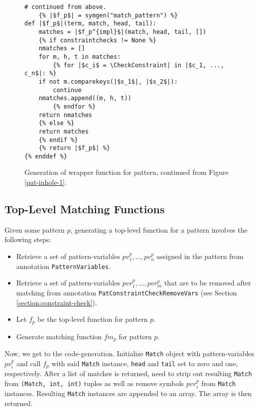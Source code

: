 \begin{figure}
\begin{verbatim}
# continued from above.
	{% |$f_p$| = symgen("match_pattern") %}
def |$f_p$|(term, match, head, tail):
	matches = |$f_p^{impl}$|(match, head, tail, [])
	{% if constraintchecks != None %}
	nmatches = []
	for m, h, t in matches:
		{% for |$c_i$ = \CheckConstraint| in |$c_1, ..., c_n$|: %}
	if not m.comparekeys(|$s_1$|, |$s_2$|):
		continue
	nmatches.append((m, h, t))
		{% endfor %}
	return nmatches
	{% else %}
	return matches
	{% endif %}
	{% return |$f_p$| %}
{% enddef %}
\end{verbatim} 
\caption{Generation of wrapper function for \PatternInHoleNoArg \space pattern, continued from Figure \ref{pat-inhole-1}.}
\label{pat-inhole-2}
\end{figure}

\subsection{Top-Level Matching Functions}
Given some pattern $p$, generating a top-level function for a pattern involves the following steps: 

\begin{itemize}
\item Retrieve a set of pattern-variables $pv_1^{p}, ..., pv_n^{p}$ assigned in the pattern from annotation \texttt{PatternVariables}.
\item Retrieve a set of pattern-variables $pvr_1^{p}, ..., pvr_m^{p}$ that are to be removed after matching from annotation \texttt{PatConstraintCheckRemoveVars} (see Section \ref{section:constraint-check}).
\item Let $f_p$ be the top-level function for pattern $p$.
\item Generate matching function $fm_p$ for pattern $p$.
\end{itemize}

Now, we get to the code-generation. Initialize \texttt{Match} object with pattern-variables $pv_i^{p}$ and call $f_p$ with said \texttt{Match} instance, \texttt{head} and \texttt{tail} set to zero and one, respectively. After a list of matches is returned, need to strip out resulting \texttt{Match} from \texttt{(Match, int, int)}  tuples as well as remove symbols $pvr_i^{p}$ from \texttt{Match} instances. Resulting \texttt{Match} instances are appended to an array. The array is then returned.


